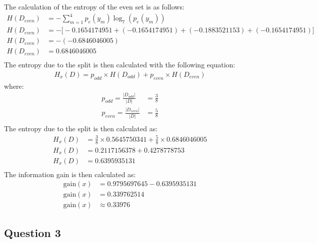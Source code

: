 \documentclass[10pt]{article}
\begin{document}
The calculation of the entropy of the even set is as follows:
\begin{align*}
    H(D_{even}) &= - \sum_{m=1}^{4} p_{e}(y_m) \log_7 \left( p_{e}(y_m) \right) \\
    H(D_{even}) &= - \big[ -0.1654174951 + (-0.1654174951) + (-0.1883521153) + (-0.1654174951)\big] \\
    H(D_{even}) &= - (-0.6846046005) \\
    H(D_{even}) &= 0.6846046005 \\
\end{align*}
The entropy due to the split is then calculated with the following equation:
\begin{align*}
    H_x(D) = p_{odd} \times H(D_{odd}) + p_{even} \times H(D_{even})
\end{align*}
where:
\begin{align*}
    p_{odd} = \frac{|D_{odd}|}{|D|} &= \frac{3}{8}\\
    p_{even} = \frac{|D_{even}|}{|D|} &= \frac{5}{8}\\
\end{align*}
The entropy due to the split is then calculated as:
\begin{align*}
    H_x(D) &= \frac{3}{8} \times 0.5645750341 + \frac{5}{8} \times 0.6846046005 \\
    H_x(D) &= 0.2117156378 + 0.4278778753 \\
    H_x(D) &= 0.6395935131 \\
\end{align*}
The information gain is then calculated as:
\begin{align*}
    \text{gain}(x) &= 0.9795697645 - 0.6395935131 \\
    \text{gain}(x) &= 0.339762514 \\
    \text{gain}(x) &\approx 0.33976
\end{align*}

\subsection*{Question 3}
\end{document}
